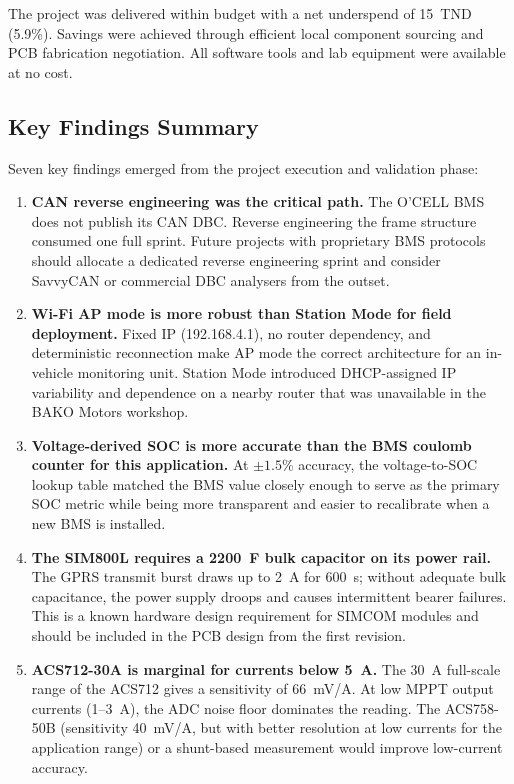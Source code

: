 The project was delivered within budget with a net underspend of 15~TND (5.9\%). Savings were achieved through efficient local component sourcing and PCB fabrication negotiation. All software tools and lab equipment were available at no cost.

\subsection{Key Findings Summary}

Seven key findings emerged from the project execution and validation phase:

\begin{enumerate}
    \item \textbf{CAN reverse engineering was the critical path.} The O'CELL BMS does not publish its CAN DBC. Reverse engineering the frame structure consumed one full sprint. Future projects with proprietary BMS protocols should allocate a dedicated reverse engineering sprint and consider SavvyCAN or commercial DBC analysers from the outset.

    \item \textbf{Wi-Fi AP mode is more robust than Station Mode for field deployment.} Fixed IP (192.168.4.1), no router dependency, and deterministic reconnection make AP mode the correct architecture for an in-vehicle monitoring unit. Station Mode introduced DHCP-assigned IP variability and dependence on a nearby router that was unavailable in the BAKO Motors workshop.

    \item \textbf{Voltage-derived SOC is more accurate than the BMS coulomb counter for this application.} At $\pm 1.5\%$ accuracy, the voltage-to-SOC lookup table matched the BMS value closely enough to serve as the primary SOC metric while being more transparent and easier to recalibrate when a new BMS is installed.

    \item \textbf{The SIM800L requires a 2200~\textmu{}F bulk capacitor on its power rail.} The GPRS transmit burst draws up to 2~A for 600~\textmu{}s; without adequate bulk capacitance, the power supply droops and causes intermittent bearer failures. This is a known hardware design requirement for SIMCOM modules and should be included in the PCB design from the first revision.

    \item \textbf{ACS712-30A is marginal for currents below 5~A.} The 30~A full-scale range of the ACS712 gives a sensitivity of 66~mV/A. At low MPPT output currents (1--3~A), the ADC noise floor dominates the reading. The ACS758-50B (sensitivity 40~mV/A, but with better resolution at low currents for the application range) or a shunt-based measurement would improve low-current accuracy.


\end{enumerate}
